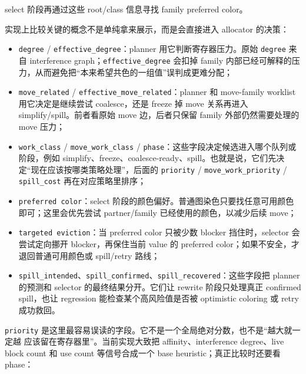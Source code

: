 \documentclass[UTF8,a4paper,11pt]{ctexart}
\begin{document}
select 阶段再通过这些 root/class 信息寻找 family preferred color。

实现上比较关键的概念不是单纯拿来展示，而是会直接进入
allocator 的决策：

\begin{itemize}
  \item \texttt{degree} / \texttt{effective\_degree}：planner 用它判断寄存器压力。原始 \texttt{degree} 来自 interference graph；\texttt{effective\_degree} 会扣掉 family 内部已经可解释的压力，从而避免把“本来希望共色的一组值”误判成更难分配；
  \item \texttt{move\_related} / \texttt{effective\_move\_related}：planner 和 move-family worklist 用它决定是继续尝试 coalesce，还是 freeze 掉 move 关系再进入 simplify/spill。前者看原始 move 边，后者只保留 family 外部仍然需要处理的 move 压力；
  \item \texttt{work\_class} / \texttt{move\_work\_class} / \texttt{phase}：这些字段决定候选进入哪个队列或阶段，例如 simplify、freeze、coalesce-ready、spill。也就是说，它们先决定“现在应该按哪类策略处理”，后面的 \texttt{priority} / \texttt{move\_work\_priority} / \texttt{spill\_cost} 再在对应策略里排序；
  \item \texttt{preferred color}：select 阶段的颜色偏好。普通图染色只要找任意可用颜色即可；这里会优先尝试 partner/family 已经使用的颜色，以减少后续 move；
  \item \texttt{targeted eviction}：当 preferred color 只被少数 blocker 挡住时，selector 会尝试定向挪开 blocker，再保住当前 value 的 preferred color；如果不安全，才退回普通可用颜色或 spill/retry 路线；
  \item \texttt{spill\_intended}、\texttt{spill\_confirmed}、\texttt{spill\_recovered}：这些字段把 planner 的预测和 selector 的最终结果分开。它们让 rewrite 阶段只处理真正 confirmed spill，也让 regression 能检查某个高风险值是否被 optimistic coloring 或 retry 成功救回。
\end{itemize}

\texttt{priority} 是这里最容易误读的字段。它不是一个全局绝对分数，也不是“越大就一定越
应该留在寄存器里”。当前实现大致把 affinity、interference degree、live block count 和
use count 等信号合成一个 base heuristic；真正比较时还要看 phase：
\end{document}
